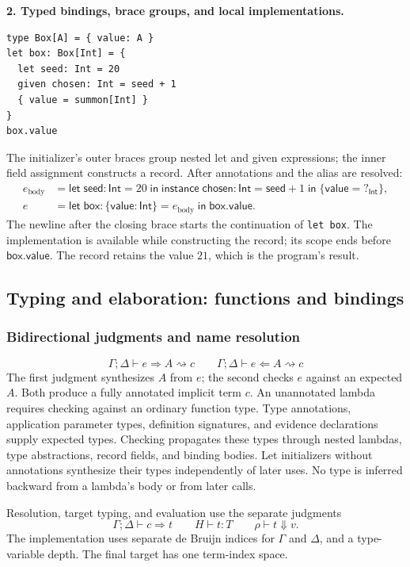 \documentclass[10pt,a4paper]{article}
\newcommand{\Int}{\mathsf{Int}}
\newcommand{\E}[3]{\Gamma;\Delta\vdash #1\Rightarrow #2\rightsquigarrow #3}
\newcommand{\EC}[3]{\Gamma;\Delta\vdash #1\Leftarrow #2\rightsquigarrow #3}
\newcommand{\R}[2]{\Gamma;\Delta\vdash #1\Longrightarrow #2}
\newcommand{\hole}[1]{?_{#1}}
\newcommand{\letin}[3]{\mathsf{let}\;#1=#2\;\mathsf{in}\;#3}
\newcommand{\instancelet}[4]{\mathsf{instance}\;#1:#2=#3\;\mathsf{in}\;#4}
\newcommand{\eval}[3]{#1\vdash #2\Downarrow #3}
\newcommand{\kw}[1]{\mathsf{#1}}
\begin{document}
\textbf{2. Typed bindings, brace groups, and local implementations.}
\begin{lstlisting}
type Box[A] = { value: A }
let box: Box[Int] = {
  let seed: Int = 20
  given chosen: Int = seed + 1
  { value = summon[Int] }
}
box.value
\end{lstlisting}
The initializer's outer braces group nested let and given expressions; the inner
field assignment constructs a record. After annotations and the alias are resolved:
\[
\begin{aligned}
e_{\mathrm{body}}
 &=\letin{\kw{seed}:\Int}{20}{
   \instancelet{\kw{chosen}}{\Int}{\kw{seed}+1}{\{\kw{value}=\hole{\Int}\}}},\\
e
 &=\letin{\kw{box}:\{\kw{value}:\Int\}}{e_{\mathrm{body}}}{\kw{box}.\kw{value}}.
\end{aligned}
\]
The newline after the closing brace starts the continuation of \texttt{let box}.
The implementation is available while constructing the record; its scope ends before
$\kw{box}.\kw{value}$. The record retains the value $21$, which is the program's result.

\newpage
\subsection{Typing and elaboration: functions and bindings}
\label{sec:elaboration-functions}
\subsubsection*{Bidirectional judgments and name resolution}
\[
\boxed{\E e A c}\qquad\boxed{\EC e A c}
\]
The first judgment synthesizes $A$ from $e$; the second checks $e$ against an expected
$A$. Both produce a fully annotated implicit term $c$. An unannotated lambda requires
checking against an ordinary function type. Type annotations, application parameter types,
definition signatures, and evidence declarations supply expected types. Checking propagates
these types through nested lambdas, type abstractions, record fields, and binding bodies.
Let initializers without annotations synthesize their types independently of later uses.
No type is inferred backward from a lambda's body or from later calls.

Resolution, target typing, and evaluation use the separate judgments
\[
\boxed{\R c t}\qquad\boxed{H\vdash t:T}\qquad\boxed{\eval\rho t v}.
\]
The implementation uses separate de Bruijn indices for $\Gamma$ and $\Delta$, and a
type-variable depth. The final target has one term-index space.
\end{document}
